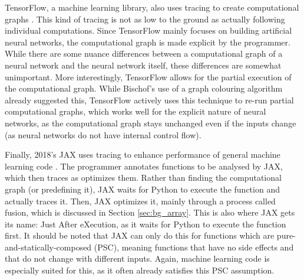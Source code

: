         TensorFlow, a machine learning library, also uses tracing to create computational graphs \cite{abadi2016tensorflow}.
        This kind of tracing is not as low to the ground as actually following individual computations.
        Since TensorFlow mainly focuses on building artificial neural networks, the computational graph is made explicit by the programmer.
        While there are some nuance differences between a computational graph of a neural network and the neural network itself, these differences are somewhat unimportant.
        More interestingly, TensorFlow allows for the partial execution of the computational graph.
        While Bischof's use of a graph colouring algorithm already suggested this, TensorFlow actively uses this technique to re-run partial computational graphs, which works well for the explicit nature of neural networks, as the computational graph stays unchanged even if the inputs change (as neural networks do not have internal control flow).

        Finally, 2018's JAX uses tracing to enhance performance of general machine learning code \cite{frostig2018compiling}.
        The programmer annotates functions to be analysed by JAX, which then traces as optimizes them.
        Rather than finding the computational graph (or predefining it), JAX waits for Python to execute the function and actually traces it.
        Then, JAX optimizes it, mainly through a process called fusion, which is discussed in Section \ref{sec:bg_array}.
        This is also where JAX gets its name: Just After eXecution, as it waits for Python to execute the function first.
        It should be noted that JAX can only do this for functions which are pure-and-statically-composed (PSC), meaning functions that have no side effects and that do not change with different inputs.
        Again, machine learning code is especially suited for this, as it often already satisfies this PSC assumption.
        

